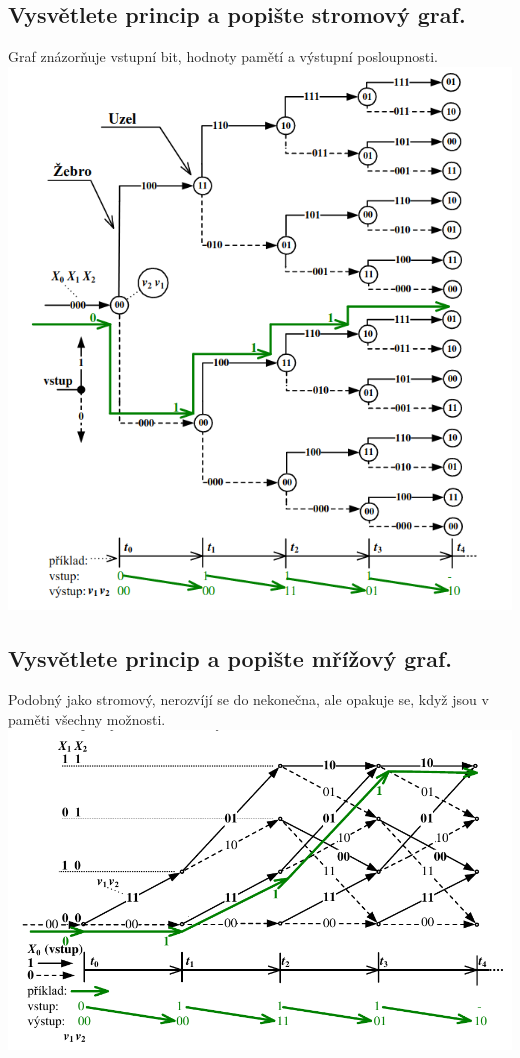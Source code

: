 \subsection{Vysvětlete princip a popište stromový graf.}
Graf znázorňuje vstupní bit, hodnoty pamětí a výstupní posloupnosti.\\
\includegraphics[width=16cm]{images/8_strom.png}

\subsection{Vysvětlete princip a popište mřížový graf.}
Podobný jako stromový, nerozvíjí se do nekonečna, ale opakuje se, když jsou v paměti všechny možnosti. \\
\includegraphics[width=16cm]{images/8_mriz.png}

